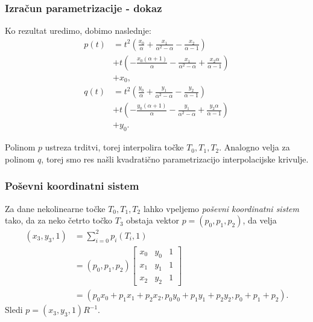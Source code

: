 \documentclass{beamer}
\newcommand{\al}{\alpha}
\begin{document}

\begin{frame}

\frametitle{Izračun parametrizacije - dokaz}

Ko rezultat uredimo, dobimo naslednje: 
\begin{align*}
p(t) &= t^2 ( \frac{x_0}{\al} + \frac{x_1}{\al^2 - \al} - \frac{x_2}{\al -1} ) \\
&+ t(- \frac{x_0(\al + 1)}{\al} - \frac{x_1}{\al^2 - \al} + \frac{x_2 \al}{\al - 1}) \\
&+ x_0, \\
q(t) &= t^2 ( \frac{y_0}{\al} + \frac{y_1}{\al^2 - \al} - \frac{y_2}{\al -1} ) \\ 
&+ t(- \frac{y_0(\al + 1)}{\al} - \frac{y_1}{\al^2 - \al} + \frac{y_2 \al}{\al - 1}) \\ 
&+ y_0.
\end{align*}

Polinom $p$ ustreza trditvi, torej interpolira točke $T_0, T_1, T_2$. 
Analogno velja za polinom $q$, torej smo res našli kvadratično parametrizacijo interpolacijske krivulje.

\end{frame}


\begin{frame}

\frametitle{Poševni koordinatni sistem}

Za dane nekolinearne točke $T_0, T_1, T_2$ lahko vpeljemo \emph{poševni koordinatni sistem} tako, da za neko četrto točko $T_3$ obstaja vektor $p = (p_0, p_1, p_2)$, da velja
\begin{align*}
( x_3,y_3, 1) &= \sum_{i=0}^{2} p_i (T_i, 1) \\
	&= (p_0, p_1, p_2)
\begin{bmatrix}
x_0 & y_0 & 1 \\
x_1 & y_1 & 1 \\
x_2 & y_2 & 1 
\end{bmatrix} \\
	&= (p_0 x_0 + p_1 x_1 + p_2 x_2, p_0 y_0 + p_1 y_1 + p_2 y_2, p_0 + p_1 + p_2).
\end{align*}
Sledi $ p = ( x_3,y_3, 1) R^{-1}$.


\end{frame}
\end{document}
